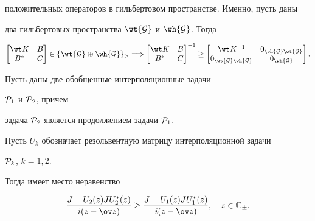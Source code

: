 положительных операторов в гильбертовом пространстве. Именно, пусть даны


два гильбертовых пространства $\wt {\cal G}$ и $\wh {\cal G}$. Тогда


\begin{equation}


\begin{bmatrix} \wt K & B \\ B^* & C


\end{bmatrix} \in \{ \wt {\cal G} \oplus \wh {\cal G} \}_>


\Longrightarrow


\begin{bmatrix} \wt K & B \\


B^* & C \end{bmatrix}^{-1} \geq


\begin{bmatrix} \wt K ^{-1} & 0_{\wh {\cal G}\wt {\cal G}} \\


0_{\wt {\cal G}\wh {\cal G}} & 0_{\wh {\cal G}} \end{bmatrix}.


\end{equation}








\begin{thm}


Пусть даны две обобщенные интерполяционные задачи


${\cal P}_1$ и ${\cal P}_2$, причем


задача $ {\cal P}_2$ является продолжением задачи $ {\cal P}_1 $.


Пусть $ U_k $ обозначает резольвентную матрицу интерполяционной задачи


$ {\cal P}_k$, $k=1,2$.





Тогда имеет место неравенство 


\begin{equation}


\frac{J- U_2(z)J U_2^*(z)} {i(z-\ov z)}\geq


\frac{J-U_1(z)J U_1^*(z)}{i(z-\ov z)}, \quad z \in {\Bbb C}_{\pm}.


\end{equation}


\end{thm}






